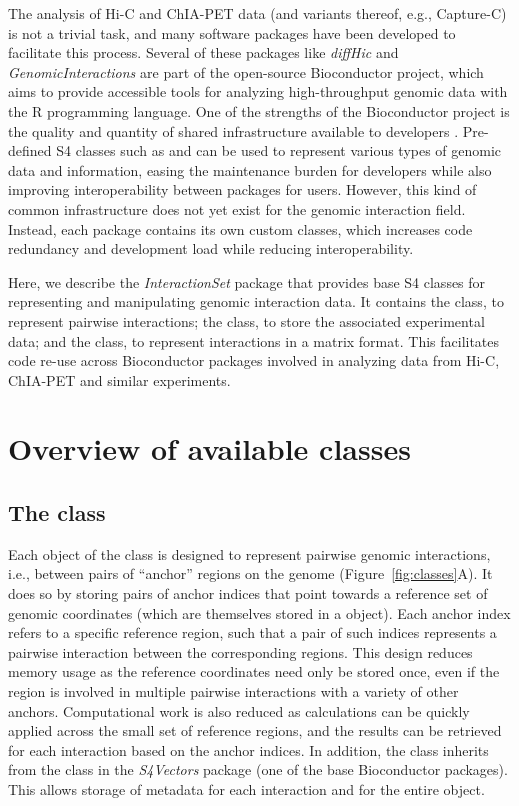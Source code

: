 \documentclass[10pt,a4paper,twocolumn]{article}
\begin{document}
The analysis of Hi-C and ChIA-PET data (and variants thereof, e.g., Capture-C) is not a trivial task, and many software packages have been developed to facilitate this process.
Several of these packages like \textit{diffHic} \cite{lun2015diffhic} and \textit{GenomicInteractions} \cite{harmston2015genomicinteractions} are part of the open-source Bioconductor project, which aims to provide accessible tools for analyzing high-throughput genomic data with the R programming language.
One of the strengths of the Bioconductor project is the quality and quantity of shared infrastructure available to developers \cite{huber2015orchestrating}.
Pre-defined S4 classes such as  and  can be used to represent various types of genomic data and information, easing the maintenance burden for developers while also improving interoperability between packages for users.
However, this kind of common infrastructure does not yet exist for the genomic interaction field.
Instead, each package contains its own custom classes, which increases code redundancy and development load while reducing interoperability.

Here, we describe the \textit{InteractionSet} package that provides base S4 classes for representing and manipulating genomic interaction data.
It contains the  class, to represent pairwise interactions; the  class, to store the associated experimental data; and the  class, to represent interactions in a matrix format.
This facilitates code re-use across Bioconductor packages involved in analyzing data from Hi-C, ChIA-PET and similar experiments.

\section*{Overview of available classes}

\subsection*{The  class}
Each object of the  class is designed to represent pairwise genomic interactions, i.e., between pairs of ``anchor'' regions on the genome (Figure~\ref{fig:classes}A).
It does so by storing pairs of anchor indices that point towards a reference set of genomic coordinates (which are themselves stored in a  object).
Each anchor index refers to a specific reference region, such that a pair of such indices represents a pairwise interaction between the corresponding regions.
This design reduces memory usage as the reference coordinates need only be stored once, even if the region is involved in multiple pairwise interactions with a variety of other anchors.
Computational work is also reduced as calculations can be quickly applied across the small set of reference regions, and the results can be retrieved for each interaction based on the anchor indices.
In addition, the  class inherits from the  class in the \textit{S4Vectors} package (one of the base Bioconductor packages).
This allows storage of metadata for each interaction and for the entire object.
\end{document}
